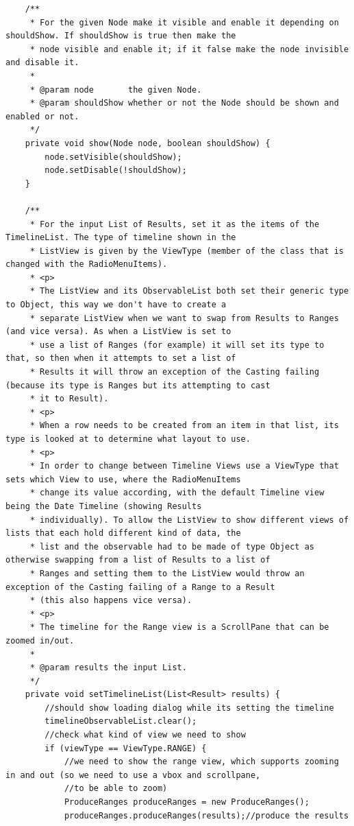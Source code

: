 \begin{lstlisting}
    /**
     * For the given Node make it visible and enable it depending on shouldShow. If shouldShow is true then make the
     * node visible and enable it; if it false make the node invisible and disable it.
     *
     * @param node       the given Node.
     * @param shouldShow whether or not the Node should be shown and enabled or not.
     */
    private void show(Node node, boolean shouldShow) {
        node.setVisible(shouldShow);
        node.setDisable(!shouldShow);
    }

    /**
     * For the input List of Results, set it as the items of the TimelineList. The type of timeline shown in the
     * ListView is given by the ViewType (member of the class that is changed with the RadioMenuItems).
     * <p>
     * The ListView and its ObservableList both set their generic type to Object, this way we don't have to create a
     * separate ListView when we want to swap from Results to Ranges (and vice versa). As when a ListView is set to
     * use a list of Ranges (for example) it will set its type to that, so then when it attempts to set a list of
     * Results it will throw an exception of the Casting failing (because its type is Ranges but its attempting to cast
     * it to Result).
     * <p>
     * When a row needs to be created from an item in that list, its type is looked at to determine what layout to use.
     * <p>
     * In order to change between Timeline Views use a ViewType that sets which View to use, where the RadioMenuItems
     * change its value according, with the default Timeline view being the Date Timeline (showing Results
     * individually). To allow the ListView to show different views of lists that each hold different kind of data, the
     * list and the observable had to be made of type Object as otherwise swapping from a list of Results to a list of
     * Ranges and setting them to the ListView would throw an exception of the Casting failing of a Range to a Result
     * (this also happens vice versa).
     * <p>
     * The timeline for the Range view is a ScrollPane that can be zoomed in/out.
     *
     * @param results the input List.
     */
    private void setTimelineList(List<Result> results) {
        //should show loading dialog while its setting the timeline
        timelineObservableList.clear();
        //check what kind of view we need to show
        if (viewType == ViewType.RANGE) {
            //we need to show the range view, which supports zooming in and out (so we need to use a vbox and scrollpane,
            //to be able to zoom)
            ProduceRanges produceRanges = new ProduceRanges();
            produceRanges.produceRanges(results);//produce the results


\end{lstlisting}
